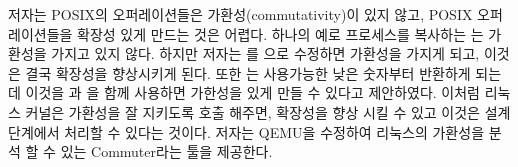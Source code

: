 저자는 POSIX의 오퍼레이션들은 가환성(commutativity)이 있지 않고, POSIX 오퍼레이션들을 
확장성 있게 만드는 것은 어렵다.
하나의 예로 프로세스를 복사하는 는 가환성을 가지고 있지 않다. 
하지만 저자는 를 으로 수정하면 가환성을 가지게 되고, 이것은 결국 
확장성을 향상시키게 된다.  
또한 는 사용가능한 낮은 숫자부터 반환하게 되는데 이것을 과 을 함께
사용하면 가한성을 있게 만들 수 있다고 제안하였다.
이처럼 리눅스 커널은 가환성을 잘 지키도록 호출 해주면, 확장성을 향상 시킬 수 있고 이것은 설계단계에서 
처리할 수 있다는 것이다.
저자는 QEMU을 수정하여 리눅스의 가환성을 분석 할 수 있는 Commuter라는 툴을 제공한다. 


